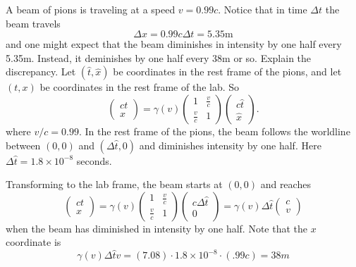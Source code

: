 \documentclass[minion]{homework}
\begin{document}
\begin{aproblems}
A beam of pions is traveling at a speed $v=0.99c$. Notice that in time $\Delta t$ the beam
travels
\begin{equation}
\Delta x = 0.99 c \Delta t = 5.35 \mathrm{m}
\end{equation}
and one might expect that the beam diminishes in intensity by one half every 5.35m.  Instead,
it deminishes by one half every 38m or so.  Explain the discrepancy.
\solution
Let $(\hat t, \hat x)$ be coordinates in the rest frame of the pions, and let $(t,x)$ 
be coordinates in the rest frame of the lab.  So
\begin{equation}
\begin{pmatrix} ct \\ x \end{pmatrix} = \gamma(v) \begin{pmatrix} 1 & \frac{v}{c} \\ \frac{v}{c} & 1\end{pmatrix} \begin{pmatrix} c\hat t \\ \hat x \end{pmatrix}.
\end{equation}
where $v/c=0.99$.  In the rest frame of the pions, the beam follows the worldline between $(0,0)$
and $(\Delta \hat t, 0)$ and diminishes intensity by one half.  Here $\Delta\hat t = 1.8\times 10^{-8}$ seconds.

Transforming to the lab frame, the beam starts at $(0,0)$ and reaches
\begin{equation}
\begin{pmatrix} ct \\ x \end{pmatrix} = \gamma(v) \begin{pmatrix} 1 & \frac{v}{c} \\ \frac{v}{c} & 1\end{pmatrix} \begin{pmatrix} c\Delta \hat t \\ 0 \end{pmatrix} = \gamma(v) \Delta \hat t
\begin{pmatrix} c \\ v \end{pmatrix}
\end{equation}
when the beam has diminished in intensity by one half.  Note that the $x$ coordinate is
\begin{equation}
\gamma(v) \Delta\hat t v = (7.08) \cdot 1.8\times 10^{-8} \cdot (.99c)  = 38m
\end{equation}

\end{aproblems}
\end{document}
